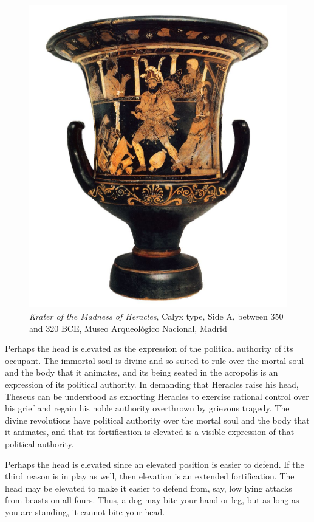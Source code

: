 \begin{figure}[htbp]
     \centering
         \includegraphics[scale=0.25]{graphics/heracles.jpg}
     \caption{\emph{Krater of the Madness of Heracles}, Calyx type, Side A, between 350 and 320 BCE, Museo Arqueológico Nacional, Madrid}
     \label{heracles}
\end{figure}

Perhaps the head is elevated as the expression of the political authority of its occupant. The immortal soul is divine and so suited to rule over the mortal soul and the body that it animates, and its being seated in the acropolis is an expression of its political authority. In demanding that Heracles raise his head, Theseus can be understood as exhorting Heracles to exercise rational control over his grief and regain his noble authority overthrown by grievous tragedy. The divine revolutions have political authority over the mortal soul and the body that it animates, and that its fortification is elevated is a visible expression of that political authority. 

Perhaps the head is elevated since an elevated position is easier to defend. If the third reason is in play as well, then elevation is an extended fortification. The head may be elevated to make it easier to defend from, say, low lying attacks from beasts on all fours. Thus, a dog may bite your hand or leg, but as long as you are standing, it cannot bite your head.

